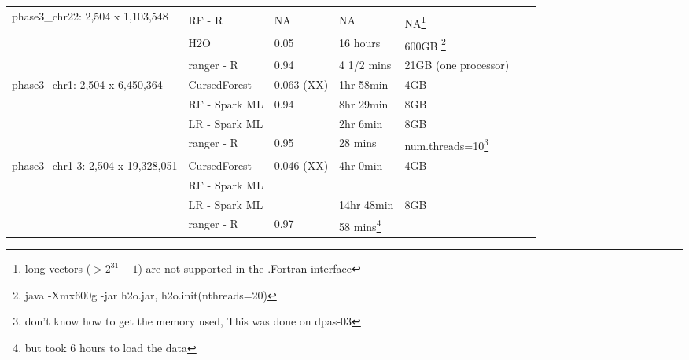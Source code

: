 \documentclass[11pt]{article}
\newcommand{\cursedforest}{{\sc CursedForest}}
\begin{document}
\begin{table}[!ht]
\begin{minipage}{\textwidth}
\begin{tabular}{|l|l|l|l|l|l|p{1cm}|}
 \hline
\multirow{3}{*}{phase3\_chr22: 2,504 x 1,103,548}   &               &            &                  &                                                                \\
                                                    & RF - R        & NA         & NA               & NA\footnote{long vectors ($> 2^31-1$)  are not supported in the .Fortran interface} \\
                                                    & H2O           & 0.05       & 16 hours         & 600GB \footnote{java -Xmx600g -jar h2o.jar,   h2o.init(nthreads=20)} \\
                                                    & ranger - R    & 0.94       & 4 1/2 mins       & 21GB (one processor) \\
\hline
\multirow{3}{*}{phase3\_chr1: 2,504 x 6,450,364}    & \cursedforest\ & 0.063 (XX) & 1hr 58min        & 4GB \\
                                                    & RF - Spark ML  & 0.94       & 8hr 29min        & 8GB \\
                                                    & LR - Spark ML  &            & 2hr 6min         & 8GB \\
                                                    & ranger - R      & 0.95       & 28 mins          & num.threads=10\footnote{don't
                                                                                                      know how to get the memory
                                                                                                      used,   This was done on dpas-03} \\
\hline
\multirow{3}{*}{phase3\_chr1-3: 2,504 x 19,328,051} & \cursedforest\ & 0.046 (XX) & 4hr 0min                                             & 4GB \\
                                                    & RF - Spark ML  &            &                                                      & \\
                                                    & LR - Spark ML  &            & 14hr 48min                                           & 8GB \\
                                                    & ranger - R      &  0.97      & 58 mins\footnote{ but took 6 hours to load the
                                                                                   data}
                                                                                                                                         &

\end{tabular}
\end{minipage}
\end{table}
\end{document}
